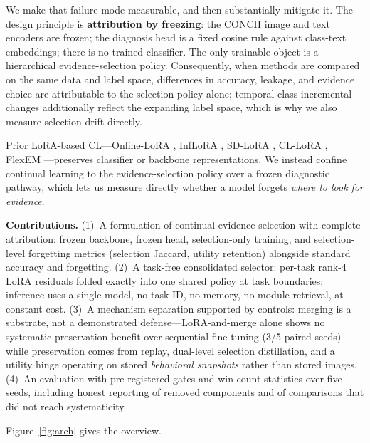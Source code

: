 \documentclass[11pt]{article}
\begin{document}
We make that failure mode measurable, and then substantially mitigate it. The design principle is \textbf{attribution by freezing}: the CONCH image and text encoders \citep{lu2024conch} are frozen; the diagnosis head is a fixed cosine rule against class-text embeddings; there is no trained classifier. The only trainable object is a hierarchical evidence-selection policy. Consequently, when methods are compared on the same data and label space, differences in accuracy, leakage, and evidence choice are attributable to the selection policy alone; temporal class-incremental changes additionally reflect the expanding label space, which is why we also measure selection drift directly.

Prior LoRA-based CL---Online-LoRA \citep{wei2025onlinelora}, InfLoRA \citep{liang2024inflora}, SD-LoRA \citep{wu2025sdlora}, CL-LoRA \citep{he2025cllora}, FlexEM \citep{chen2026flexem}---preserves classifier or backbone representations. We instead confine continual learning to the evidence-selection policy over a frozen diagnostic pathway, which lets us measure directly whether a model forgets \emph{where to look for evidence}.

\textbf{Contributions.}
(1)~A formulation of continual evidence selection with complete attribution: frozen backbone, frozen head, selection-only training, and selection-level forgetting metrics (selection Jaccard, utility retention) alongside standard accuracy and forgetting.
(2)~A task-free consolidated selector: per-task rank-4 LoRA residuals folded exactly into one shared policy at task boundaries; inference uses a single model, no task ID, no memory, no module retrieval, at constant cost.
(3)~A mechanism separation supported by controls: merging is a substrate, not a demonstrated defense---LoRA-and-merge alone shows no systematic preservation benefit over sequential fine-tuning (3/5 paired seeds)---while preservation comes from replay, dual-level selection distillation, and a utility hinge operating on stored \emph{behavioral snapshots} rather than stored images.
(4)~An evaluation with pre-registered gates and win-count statistics over five seeds, including honest reporting of removed components and of comparisons that did not reach systematicity.

Figure~\ref{fig:arch} gives the overview.
\end{document}
